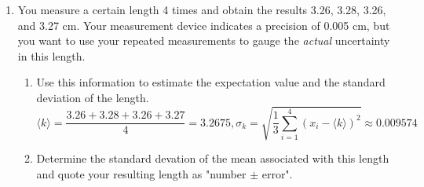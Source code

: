 \documentclass{article}
\begin{document}
\begin{enumerate}
\begin{enumerate}
        \\
        \[1 - \left( \frac 5 6\right)^{14} - \binom{14}{1}\left(\frac 1 6\right) \left(\frac 5 6\right)^{13} - \binom{14}{2}\left(\frac 1 6\right)^2 \left(\frac 5 6\right)^{12} - \binom{14}{3}\left(\frac 1 6\right)^3 \left(\frac 5 6\right)^{11} \approx \boxed{0.1937} \]
        \item Explain how the additional information in parts (d)-(f) changes the likelihood of the gambler being successful.
        \\ \\ Changing the amount of rolls that have already occurred reduces the probability by reducing the amount of possible tries the gambler has to roll the 1s needed to win, and increasing the number of 1s already rolled reduces the amount that the gambler needs rolled in order to win. \\
        \item Suppose now that the die will be rolled 20 times instead of 24. How does this change your answers to (a) and (b)? What does this imply about the statement, "The largest probability is associated with 1 coming up the expected number of times."?
        \\ \\ Changing the amount of trials to be done makes my answer to part (a) $20 \times \frac 1 6 = \boxed{\frac {10} 3}$ and part (b) $\binom{20}{4} \left( \frac 1 6\right)^4 \left(\frac 5 6 \right)^{16} \approx \boxed{0.2022}$. This implies that the statement is not necessarily true, since 1 can't possibly come up a fractional number of times.
    \end{enumerate}
    \item You measure a certain length 4 times and obtain the results 3.26, 3.28, 3.26, and 3.27 cm. Your measurement device indicates a precision of 0.005 cm, but you want to use your repeated measurements to gauge the \textit{actual} uncertainty in this length.
    \begin{enumerate}
        \item Use this information to estimate the expectation value and the standard deviation of the length.
        \\
        \[\langle k \rangle = \frac{3.26 + 3.28 + 3.26 + 3.27}{4} = \boxed{3.2675}, \sigma_k = \sqrt{\frac{1}{3}\sum_{i=1}^4 (x_i - \langle k \rangle)^2} \approx \boxed{0.009574}\]
        \item Determine the standard devation of the mean associated with this length and quote your resulting length as "number $\pm$ error".

\end{enumerate}
\end{enumerate}
\end{document}
